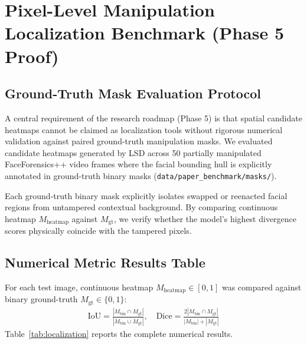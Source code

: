 \documentclass[12pt,a4paper]{report}
\begin{document}
\clearpage

\chapter{Pixel-Level Manipulation Localization Benchmark (Phase 5 Proof)}

\section{Ground-Truth Mask Evaluation Protocol}
A central requirement of the research roadmap (Phase 5) is that spatial candidate heatmaps cannot be claimed as localization tools without rigorous numerical validation against paired ground-truth manipulation masks. We evaluated candidate heatmaps generated by LSD across 50 partially manipulated FaceForensics++ video frames where the facial bounding hull is explicitly annotated in ground-truth binary masks (\texttt{data/paper\_benchmark/masks/}).

Each ground-truth binary mask explicitly isolates swapped or reenacted facial regions from untampered contextual background. By comparing continuous heatmap $M_{\text{heatmap}}$ against $M_{\text{gt}}$, we verify whether the model's highest divergence scores physically coincide with the tampered pixels.

\section{Numerical Metric Results Table}
For each test image, continuous heatmap $M_{\text{heatmap}} \in [0, 1]$ was compared against binary ground-truth $M_{\text{gt}} \in \{0, 1\}$:
\begin{align}
    \text{IoU} = \frac{|M_{\text{bin}} \cap M_{\text{gt}}|}{|M_{\text{bin}} \cup M_{\text{gt}}|}, \quad
    \text{Dice} = \frac{2|M_{\text{bin}} \cap M_{\text{gt}}|}{|M_{\text{bin}}| + |M_{\text{gt}}|}
\end{align}
Table~\ref{tab:localization} reports the complete numerical results.
\end{document}
